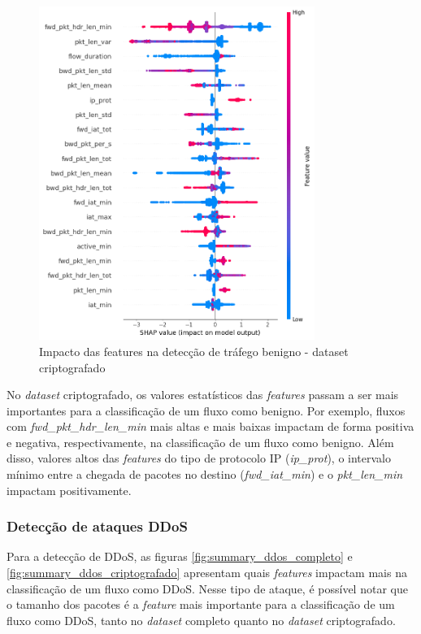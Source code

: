 \documentclass[12pt]{article}
\begin{document}
\begin{figure}[h!]
    \centering
    \includegraphics[width=0.8\textwidth]{figures/summary_benigno_criptografado.png}
    \caption{Impacto das features na detecção de tráfego benigno - dataset criptografado}
    \label{fig:summary_benigno_criptografado}
\end{figure}

No \emph{dataset} criptografado, os valores estatísticos das \emph{features} passam a ser mais importantes para a classificação de um fluxo como benigno. Por exemplo, fluxos com \textit{fwd\_pkt\_hdr\_len\_min} mais altas e mais baixas impactam de forma positiva e negativa, respectivamente, na classificação de um fluxo como benigno. Além disso, valores altos das \emph{features} do tipo de protocolo IP (\textit{ip\_prot}), o intervalo mínimo entre a chegada de pacotes no destino (\textit{fwd\_iat\_min}) e o \textit{pkt\_len\_min} impactam positivamente.

\subsubsection{Detecção de ataques DDoS}
\label{subsec:ddos}

Para a detecção de DDoS, as figuras \ref{fig:summary_ddos_completo} e \ref{fig:summary_ddos_criptografado} apresentam quais \emph{features} impactam mais na classificação de um fluxo como DDoS. Nesse tipo de ataque, é possível notar que o tamanho dos pacotes é a \emph{feature} mais importante para a classificação de um fluxo como DDoS, tanto no \emph{dataset} completo quanto no \emph{dataset} criptografado.
\end{document}
